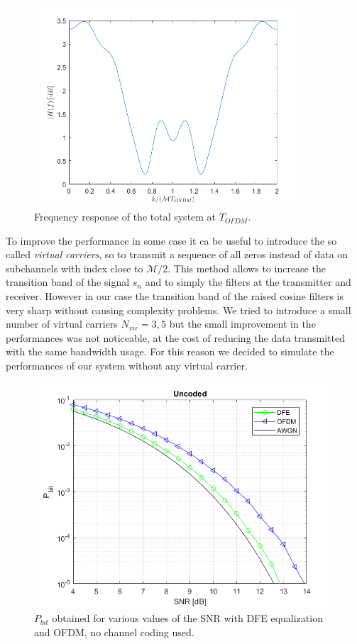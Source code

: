 \documentclass[a4paper,11.5pt]{article}
\begin{document}
\begin{figure}[H]
	\begin{center}   
		\includegraphics[width=10cm]{figs/H_mag.png} 
		\caption{Frequency response of the total system at $T_{OFDM}$.}
		\label{fig:H}
	\end{center}
\end{figure}


To improve the performance in some case it ca be useful to introduce the so called \emph{virtual carriers}, so to transmit a sequence of all zeros instead of data on subchannels with index close to $\mathcal{M}/2$. This method allows to increase the transition band of the signal $s_n$ and to simply the filters at the transmitter and receiver. However in our case the transition band of the raised cosine filters is very sharp without causing complexity problems. We tried to introduce a small number of virtual carriers $N_{vir} = 3,5$ but the small improvement in the performances was not noticeable, at the cost of reducing the data transmitted with the same bandwidth usage. For this reason we decided to simulate the performances of our system without any virtual carrier.


\begin{figure}[H]
	\begin{center}   
		\includegraphics[width=\textwidth]{figs/Pbit_uncoded.png} 
		\caption{$P_{bit}$ obtained for various values of the SNR with DFE equalization and OFDM, no channel coding used.}
		\label{fig:Pbit_uncoded}
	\end{center}
\end{figure}
\end{document}
